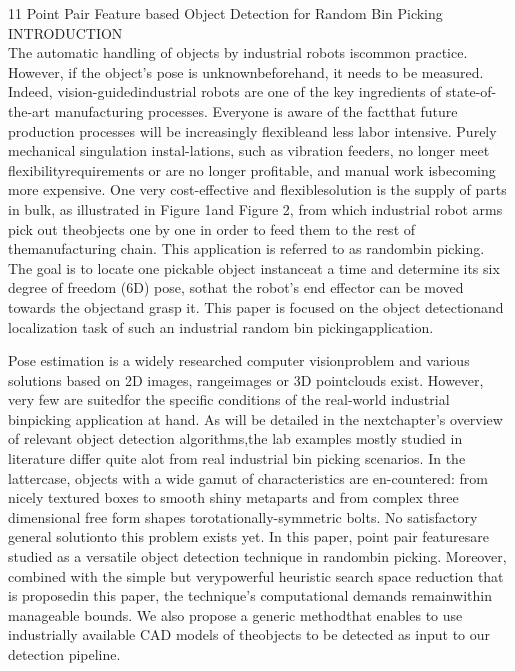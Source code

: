\documentclass[10]{article}
\begin{document}
11 Point Pair Feature based Object Detection for Random Bin Picking\\

INTRODUCTION\\
The automatic handling of objects by industrial robots iscommon practice. However, if the object’s pose is unknownbeforehand, it needs to be measured. Indeed, vision-guidedindustrial robots are one of the key ingredients of state-of-the-art manufacturing processes. Everyone is aware of the factthat future production processes will be increasingly flexibleand less labor intensive. Purely mechanical singulation instal-lations, such as vibration feeders, no longer meet flexibilityrequirements or are no longer profitable, and manual work isbecoming more expensive. One very cost-effective and flexiblesolution is the supply of parts in bulk, as illustrated in Figure 1and Figure 2, from which industrial robot arms pick out theobjects one by one in order to feed them to the rest of themanufacturing chain. This application is referred to as randombin picking. The goal is to locate one pickable object instanceat a time and determine its six degree of freedom (6D) pose, sothat the robot’s end effector can be moved towards the objectand grasp it. This paper is focused on the object detectionand localization task of such an industrial random bin pickingapplication.

Pose estimation is a widely researched computer visionproblem and various solutions based on 2D images, rangeimages or 3D pointclouds exist. However, very few are suitedfor the specific conditions of the real-world industrial binpicking application at hand. As will be detailed in the nextchapter’s overview of relevant object detection algorithms,the lab examples mostly studied in literature differ quite alot from real industrial bin picking scenarios. In the lattercase, objects with a wide gamut of characteristics are en-countered: from nicely textured boxes to smooth shiny metaparts and from complex three dimensional free form shapes torotationally-symmetric bolts. No satisfactory general solutionto this problem exists yet. In this paper, point pair featuresare studied as a versatile object detection technique in randombin picking. Moreover, combined with the simple but verypowerful heuristic search space reduction that is proposedin this paper, the technique’s computational demands remainwithin manageable bounds. We also propose a generic methodthat enables to use industrially available CAD models of theobjects to be detected as input to our detection pipeline.
\end{document}
